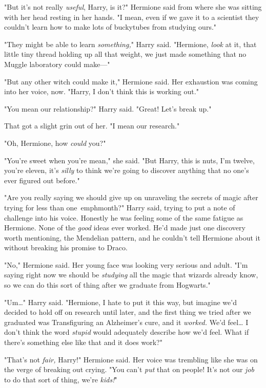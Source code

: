 "But it's not really \emph{useful}, Harry, is it?" Hermione said from where she 
was sitting with her head resting in her hands. "I mean, even if we gave it to 
a scientist they couldn't learn how to make lots of buckytubes from studying 
ours."

"They might be able to learn \emph{something,}" Harry said. "Hermione, 
\emph{look} at it, that little tiny thread holding up all that weight, we just 
made something that no Muggle laboratory could make---"

"But any other witch could make it," Hermione said. Her exhaustion was coming 
into her voice, now. "Harry, I don't think this is working out."

"You mean our relationship?" Harry said. "Great! Let's break up."

That got a slight grin out of her. "I mean our research."

"Oh, Hermione, how \emph{could} you?"

"You're sweet when you're mean," she said. "But Harry, this is nuts, I'm 
twelve, you're eleven, it's \emph{silly} to think we're going to discover 
anything that no one's ever figured out before."

"Are you really saying we should give up on unraveling the secrets of magic 
after trying for less than one\ emph{month?}" Harry said, trying to put a note 
of challenge into his voice. Honestly he was feeling some of the same fatigue 
as Hermione. None of the \emph{good} ideas ever worked. He'd made just one 
discovery worth mentioning, the Mendelian pattern, and he couldn't tell 
Hermione about it without breaking his promise to Draco.

"No," Hermione said. Her young face was looking very serious and adult. "I'm 
saying right now we should be \emph{studying} all the magic that wizards 
already know, so we can do this sort of thing after we graduate from Hogwarts."

"Um{\ldots}" Harry said. "Hermione, I hate to put it this way, but imagine we'd 
decided to hold off on research until later, and the first thing we tried after 
we graduated was Transfiguring an Alzheimer's cure, and it \emph{worked.} We'd 
feel{\ldots} I don't think the word \emph{stupid} would adequately describe how 
we'd feel. What if there's something else like that and it does work?"

"That's not \emph{fair,} Harry!" Hermione said. Her voice was trembling like 
she was on the verge of breaking out crying. "You can't \emph{put} that on 
people! It's not our \emph{job} to do that sort of thing, we're \emph{kids!}"

